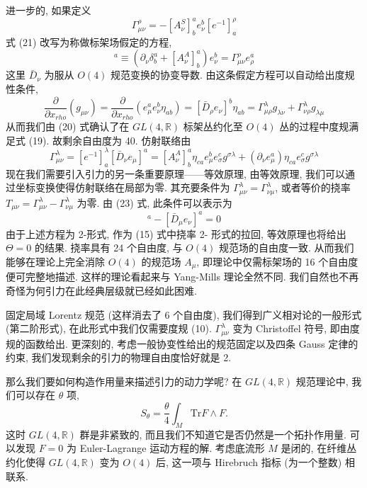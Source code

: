 \documentclass{article}
\begin{document}
进一步的, 如果定义
\begin{equation}
\Gamma_{\mu\nu}^{\rho}=-[A^{S}_{\nu}]^{a}_{b}e_{\nu}^{b}[e^{-1}]^{\rho}_{a}
\end{equation}
式 (21) 改写为称做标架场假定的方程,
\begin{equation}
[\bar{D}_{\nu}e_{\mu}]^{a}\equiv (\partial_{\nu}\delta_{b}^{a}+[A_{\nu}^{A}]^{a}_{b})e_{\nu}^{b}=\Gamma^{\rho}_{\mu\nu}e_{\rho}^{a}
\end{equation}
这里 $\bar{D}_{\nu}$ 为服从 $O(4)$ 规范变换的协变导数. 由这条假定方程可以自动给出度规性条件,
\begin{equation}
\frac{\partial }{\partial x_{rho}}(g_{\mu\nu})=\frac{\partial }{\partial x_{rho}}(e_{\mu}^{a}e_{\nu}^{b}\eta_{ab})=[\bar{D}_{\rho}e_{\nu}]^{b}\eta_{ab}=\Gamma^{\lambda}_{\mu\rho}g_{\lambda\nu}+\Gamma^{\lambda}_{\nu\rho}g_{\lambda\mu}
\end{equation}
从而我们由 (20) 式确认了在 $GL(4,\mathbb{R})$ 标架丛约化至 $O(4)$ 丛的过程中度规满足式 (19). 故剩余自由度为 40. 仿射联络由
\begin{equation}
\Gamma_{\mu\nu}^{\lambda}=[e^{-1}]^{\lambda}_{a}[\bar{D}_{\nu}e_{\mu}]^{a}=[A_{\nu}^{A}]_{b}^{a}\eta_{ca}e_{\mu}^{b}e_{\sigma}^{c}g^{\sigma\lambda}+(\partial_{\nu}e_{\mu}^{a})\eta_{ca}e_{\sigma}^{c}g^{\sigma\lambda}
\end{equation}
现在我们需要引入引力的另一条重要原理——等效原理, 由等效原理, 我们可以通过坐标变换使得仿射联络在局部为零. 其充要条件为 $\Gamma_{\mu\nu}^{\lambda}=\Gamma_{\nu\mu}^{\lambda}$, 或者等价的挠率 $T_{\mu\nu}=\Gamma_{\mu\nu}^{\lambda}-\Gamma_{\nu\mu}^{\lambda}$ 为零. 由 (23) 式, 此条件可以表示为
\begin{equation}
[\bar{D}_{\nu}e_{\mu}]^{a}-[\bar{D}_{\mu}e_{\nu}]^{a}=0
\end{equation}
由于上述方程为 2-形式, 作为 (15) 式中挠率 2- 形式的拉回, 等效原理也将给出 $\Theta=0$ 的结果. 挠率具有 24 个自由度, 与 $O(4)$ 规范场的自由度一致. 从而我们能够在理论上完全消除 $O(4)$ 的规范场 $A_{\mu}$, 即理论中仅需标架场的 16 个自由度便可完整地描述. 这样的理论看起来与 Yang-Mills 理论全然不同. 我们自然也不再奇怪为何引力在此经典层级就已经如此困难.

固定局域 Lorentz 规范 (这样消去了 6 个自由度), 我们得到广义相对论的一般形式 (第二阶形式), 在此形式中我们仅需要度规 (10). $\Gamma_{\mu\nu}^{\lambda}$ 变为 Christoffel 符号, 即由度规的函数给出. 更深刻的, 考虑一般协变性给出的规范固定以及四条 Gauss 定律的约束, 我们发现剩余的引力的物理自由度恰好就是 2.

那么我们要如何构造作用量来描述引力的动力学呢? 在 $GL(4,\mathbb{R})$ 规范理论中, 我们可以存在 $\theta$ 项,
\begin{equation}
S_{\theta}=\frac{\theta}{4}\int_{M} \text{Tr} F\wedge F.
\end{equation}
这时 $GL(4, \mathbb{R})$ 群是非紧致的, 而且我们不知道它是否仍然是一个拓扑作用量. 可以发现 $F=0$ 为 Euler-Lagrange 运动方程的解. 考虑底流形 $M$ 是闭的, 在纤维丛约化使得  $GL(4, \mathbb{R})$ 变为  $O(4)$ 后, 这一项与 Hirebruch 指标 (为一个整数) 相联系.
\end{document}
